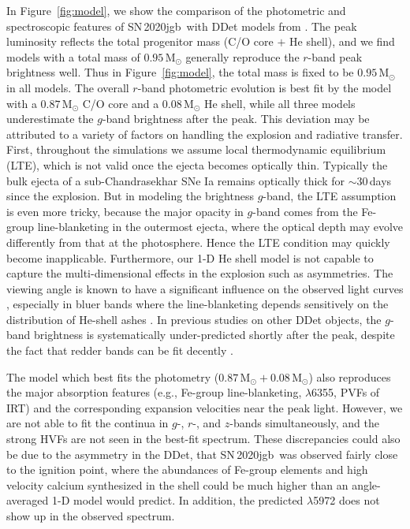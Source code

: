 \documentclass[twocolumn]{aastex631}
\newcommand{\sn}{SN\,2020jgb}
\begin{document}
In Figure~\ref{fig:model}, we show the comparison of the photometric and spectroscopic features of \sn\ with DDet models from \citet{polin_observational_2019}. The peak luminosity reflects the total progenitor mass (C/O core $+$ He shell), and we find models with a total mass of $0.95\,\mathrm{M_\odot}$ generally reproduce the $r$-band peak brightness well. Thus in Figure~\ref{fig:model}, the total mass is fixed to be $0.95\,\mathrm{M_\odot}$ in all models. The overall $r$-band photometric evolution is best fit by the model with a $0.87\,\mathrm{M_\odot}$ C/O core and a $0.08\,\mathrm{M_\odot}$ He shell, while all three models underestimate the $g$-band brightness after the peak. This deviation may be attributed to a variety of factors on handling the explosion and radiative transfer. First, throughout the simulations we assume local thermodynamic equilibrium (LTE), which is not valid once the ejecta becomes optically thin. Typically the bulk ejecta of a sub-Chandrasekhar SNe Ia remains optically thick for $\sim$30\,days since the explosion. But in modeling the brightness $g$-band, the LTE assumption is even more tricky, because the major opacity in $g$-band comes from the Fe-group line-blanketing in the outermost ejecta, where the optical depth may evolve differently from that at the photosphere. Hence the LTE condition may quickly become inapplicable. Furthermore, our 1-D He shell model is not capable to capture the multi-dimensional effects in the explosion such as asymmetries. The viewing angle is known to have a significant influence on the observed light curves \citep{Kromer_DD_2010, Sim_2012, Gronow_2020, Shen_2021}, especially in bluer bands where the line-blanketing depends sensitively on the distribution of He-shell ashes \citep{Shen_2021}. In previous studies on other DDet objects, the $g$-band brightness is systematically under-predicted shortly after the peak, despite the fact that redder bands can be fit decently \citep[e.g.][]{jiang_16jhr_2017,jacobson-galan_16hnk_2020}.

The model which best fits the photometry ($0.87\,\mathrm{M_\odot}+0.08\,\mathrm{M_\odot}$) also reproduces the major absorption features (e.g., Fe-group line-blanketing,  $\lambda$6355, PVFs of  IRT) and the corresponding expansion velocities near the peak light. 
However, we are not able to fit the continua in $g$-, $r$-, and $z$-bands simultaneously, and the strong  HVFs are not seen in the best-fit spectrum. These discrepancies could also be due to the asymmetry in the DDet, that \sn\ was observed fairly close to the ignition point, where the abundances of Fe-group elements and high velocity calcium synthesized in the shell could be much higher than an angle-averaged 1-D model would predict.
In addition, the predicted  $\lambda$5972 does not show up in the observed spectrum.
\end{document}
